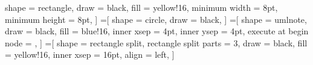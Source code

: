 			shape = rectangle,
			draw = black,
			fill = yellow!16,
			minimum  width = 8pt,
			minimum height = 8pt,
		]
	=[
			shape = circle,
			draw = black,
		]
	{
		\inheritsavedanchors[from=rectangle]
		\inheritanchorborder[from=rectangle]
	}
	=[
			shape = umlnote,
			draw = black,
			fill = blue!16,
			inner xsep = 4pt,
			inner ysep = 4pt,
			execute at begin node = \tiny,
		]
	=[
			shape = rectangle split,
			rectangle split parts = 3,
			draw = black,
			fill = yellow!16,
			inner xsep = 16pt,
			align = left,
		]
\makeatother